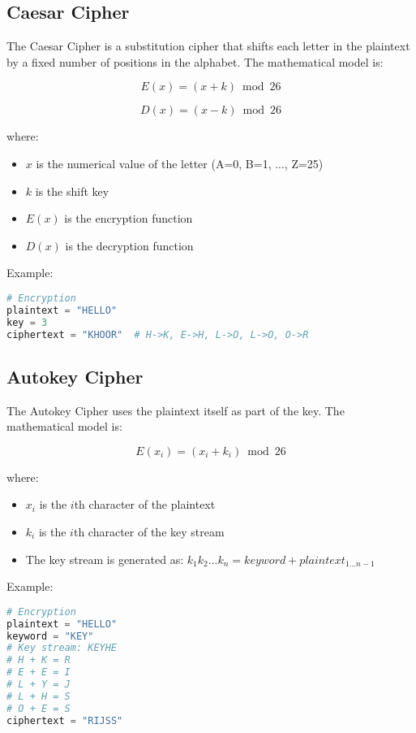 \documentclass[12pt,a4paper]{article}
\begin{document}
\subsection{Caesar Cipher}
The Caesar Cipher is a substitution cipher that shifts each letter in the plaintext by a fixed number of positions in the alphabet. The mathematical model is:

\begin{equation}
E(x) = (x + k) \bmod 26
\end{equation}

\begin{equation}
D(x) = (x - k) \bmod 26
\end{equation}

where:
\begin{itemize}
    \item $x$ is the numerical value of the letter (A=0, B=1, ..., Z=25)
    \item $k$ is the shift key
    \item $E(x)$ is the encryption function
    \item $D(x)$ is the decryption function
\end{itemize}

Example:
\begin{lstlisting}[language=Python]
# Encryption
plaintext = "HELLO"
key = 3
ciphertext = "KHOOR"  # H->K, E->H, L->O, L->O, O->R
\end{lstlisting}

\subsection{Autokey Cipher}
The Autokey Cipher uses the plaintext itself as part of the key. The mathematical model is:

\begin{equation}
E(x_i) = (x_i + k_i) \bmod 26
\end{equation}

where:
\begin{itemize}
    \item $x_i$ is the $i$th character of the plaintext
    \item $k_i$ is the $i$th character of the key stream
    \item The key stream is generated as: $k_1k_2...k_n = keyword + plaintext_{1...n-1}$
\end{itemize}

Example:
\begin{lstlisting}[language=Python]
# Encryption
plaintext = "HELLO"
keyword = "KEY"
# Key stream: KEYHE
# H + K = R
# E + E = I
# L + Y = J
# L + H = S
# O + E = S
ciphertext = "RIJSS"
\end{lstlisting}
\end{document}
